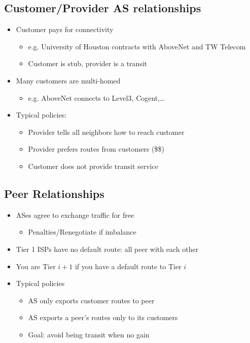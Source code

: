 \subsection{Customer/Provider AS relationships}
\begin{itemize}[nosep]
    \item Customer pays for connectivity
          \begin{itemize}[nosep]
              \item e.g. University of Houston contracts with AboveNet and TW Telecom
              \item Customer is stub, provider is a transit
          \end{itemize}
    \item Many customers are multi-homed
          \begin{itemize}[nosep]
              \item e.g. AboveNet connects to Level3, Cogent,\dots
          \end{itemize}
    \item Typical policies:
          \begin{itemize}[nosep]
              \item Provider tells all neighbors how to reach customer
              \item Provider prefers routes from customers (\$\$)
              \item Customer does not provide transit service
          \end{itemize}
\end{itemize}

\subsection{Peer Relationships}
\begin{itemize}[nosep]
    \item ASes agree to exchange traffic for free
          \begin{itemize}[nosep]
              \item Penalties/Renegotiate if imbalance
          \end{itemize}
    \item Tier 1 ISPs have no default route: all peer with each other
    \item You are Tier $i + 1$ if you have a default route to Tier $i$
    \item Typical policies
          \begin{itemize}[nosep]
              \item AS only exports customer routes to peer
              \item AS exports a peer's routes only to its customers
              \item Goal: avoid being transit when no gain
          \end{itemize}
\end{itemize}

